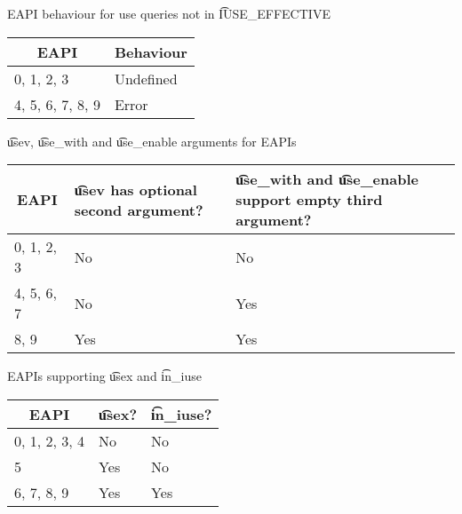 \begin{centertable}{EAPI behaviour for use queries not in \t{IUSE_EFFECTIVE}}
    \label{tab:use-list-strictness}
    \begin{tabular}{ll}
      \toprule
      \multicolumn{1}{c}{\textbf{EAPI}} &
      \multicolumn{1}{c}{\textbf{Behaviour}} \\
      \midrule
      0, 1, 2, 3        & Undefined \\
      4, 5, 6, 7, 8, 9  & Error     \\
      \bottomrule
    \end{tabular}
\end{centertable}

\begin{centertable}{\t{usev}, \t{use_with} and \t{use_enable} arguments for EAPIs}
    \label{tab:use-list-args}
    \begin{tabular}{lll}
      \toprule
      \multicolumn{1}{c}{\textbf{EAPI}} &
      \multicolumn{1}{P{8em}}{\textbf{\t{usev} has optional second argument?}} &
      \multicolumn{1}{P{14em}}{\textbf{\t{use_with} and \t{use_enable} support empty third
        argument?}} \\
      \midrule
      0, 1, 2, 3        & No  & No  \\
      4, 5, 6, 7        & No  & Yes \\
      8, 9              & Yes & Yes \\
      \bottomrule
    \end{tabular}
\end{centertable}

\begin{centertable}{EAPIs supporting \t{usex} and \t{in_iuse}}
    \label{tab:use-list-functions}
    \begin{tabular}{lll}
      \toprule
      \multicolumn{1}{c}{\textbf{EAPI}} &
      \multicolumn{1}{c}{\textbf{\t{usex}?}} &
      \multicolumn{1}{c}{\textbf{\t{in_iuse}?}} \\
      \midrule
      0, 1, 2, 3, 4     & No  & No  \\
      5                 & Yes & No  \\
      6, 7, 8, 9        & Yes & Yes \\
      \bottomrule
    \end{tabular}
\end{centertable}

